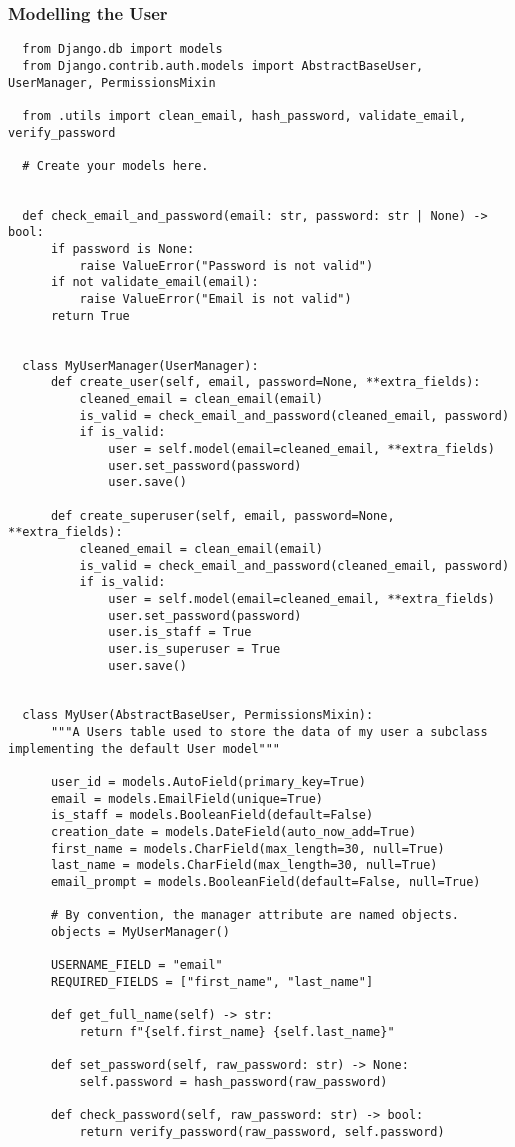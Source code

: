 \subsubsection{Modelling the User}
\begin{verbatim}
  from Django.db import models
  from Django.contrib.auth.models import AbstractBaseUser, UserManager, PermissionsMixin
  
  from .utils import clean_email, hash_password, validate_email, verify_password
  
  # Create your models here.
  
  
  def check_email_and_password(email: str, password: str | None) -> bool:
      if password is None:
          raise ValueError("Password is not valid")
      if not validate_email(email):
          raise ValueError("Email is not valid")
      return True
  
  
  class MyUserManager(UserManager):
      def create_user(self, email, password=None, **extra_fields):
          cleaned_email = clean_email(email)
          is_valid = check_email_and_password(cleaned_email, password)
          if is_valid:
              user = self.model(email=cleaned_email, **extra_fields)
              user.set_password(password)
              user.save()
  
      def create_superuser(self, email, password=None, **extra_fields):
          cleaned_email = clean_email(email)
          is_valid = check_email_and_password(cleaned_email, password)
          if is_valid:
              user = self.model(email=cleaned_email, **extra_fields)
              user.set_password(password)
              user.is_staff = True
              user.is_superuser = True
              user.save()
  
  
  class MyUser(AbstractBaseUser, PermissionsMixin):
      """A Users table used to store the data of my user a subclass implementing the default User model"""
  
      user_id = models.AutoField(primary_key=True)
      email = models.EmailField(unique=True)
      is_staff = models.BooleanField(default=False)
      creation_date = models.DateField(auto_now_add=True)
      first_name = models.CharField(max_length=30, null=True)
      last_name = models.CharField(max_length=30, null=True)
      email_prompt = models.BooleanField(default=False, null=True)
  
      # By convention, the manager attribute are named objects.
      objects = MyUserManager()
  
      USERNAME_FIELD = "email"
      REQUIRED_FIELDS = ["first_name", "last_name"]
  
      def get_full_name(self) -> str:
          return f"{self.first_name} {self.last_name}"
  
      def set_password(self, raw_password: str) -> None:
          self.password = hash_password(raw_password)
  
      def check_password(self, raw_password: str) -> bool:
          return verify_password(raw_password, self.password)
  
\end{verbatim}
